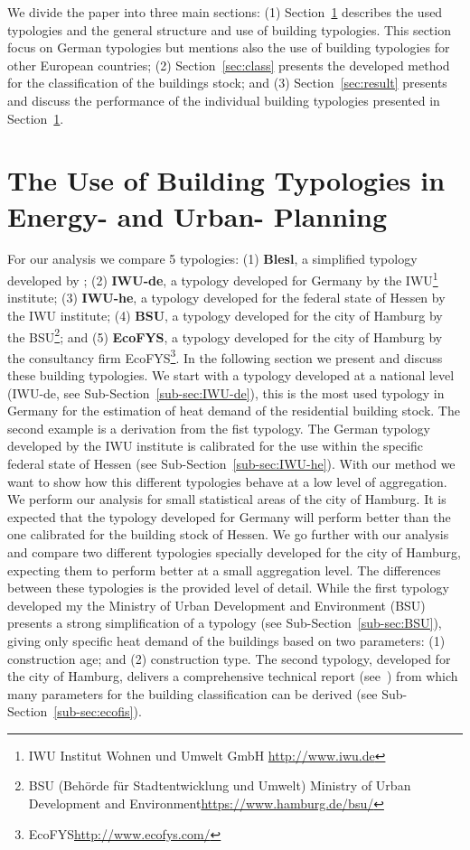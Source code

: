 We divide the paper into three main sections: (1) Section~\ref{sec:Btype}
describes the used typologies and the general structure and use of building
typologies. This section focus on German typologies but mentions also the use
of building typologies for other European countries; (2)
Section~\ref{sec:class} presents the developed method for the classification of
the buildings stock; and (3) Section~\ref{sec:result} presents and discuss the
performance of the individual building typologies presented in
Section~\ref{sec:Btype}.\\

\section{The Use of Building Typologies in Energy- and Urban-
Planning}\label{sec:Btype}

For our analysis we compare 5 typologies:
(1) \textbf{Blesl}, a simplified typology developed by
\citet{Blesl.2007};
(2) \textbf{IWU-de}, a typology developed for Germany by the IWU\footnote{IWU
    Institut Wohnen und Umwelt GmbH \url{http://www.iwu.de}} institute;
(3) \textbf{IWU-he}, a typology developed for the federal state of Hessen by
the IWU institute;
(4) \textbf{BSU}, a typology developed for the city of Hamburg by the
BSU\footnote{BSU (Behörde für Stadtentwicklung und Umwelt) Ministry of Urban
    Development and Environment\url{https://www.hamburg.de/bsu/}}; and
(5) \textbf{EcoFYS}, a typology developed for the city of Hamburg by the
consultancy firm EcoFYS\footnote{EcoFYS\url{http://www.ecofys.com/}}.
%
In the following section we present and discuss these building typologies. We
start with a typology developed at a national level (IWU-de, see
Sub-Section~\ref{sub-sec:IWU-de}), this is the most used typology in Germany
for the estimation of heat demand of the residential building stock. The second example is
a derivation from the fist typology. The German typology developed by the IWU
institute is calibrated for the use within the specific federal
state of Hessen (see Sub-Section~\ref{sub-sec:IWU-he}). With our method we
want to show how this different typologies behave at a low level of aggregation.
We perform our analysis for small statistical
areas of the city of Hamburg. It is expected that the typology developed for
Germany will perform better than the one calibrated for the building stock of
Hessen. We go further with our analysis and compare two different typologies
specially developed for the city of Hamburg, expecting them to perform
better at a small aggregation level. The differences
between these typologies is the provided level of detail. While the
first typology developed my the Ministry of Urban Development and Environment
(BSU) presents a strong simplification of a typology (see
Sub-Section~\ref{sub-sec:BSU}), giving only specific heat demand of the
buildings based on two parameters:
(1) construction age; and
(2) construction type.
The second typology, developed for the city of Hamburg, delivers a
comprehensive technical report (see~\cite{Hermelink.2011}) from which many
parameters for the building classification can be derived (see
Sub-Section~\ref{sub-sec:ecofis}).\\

